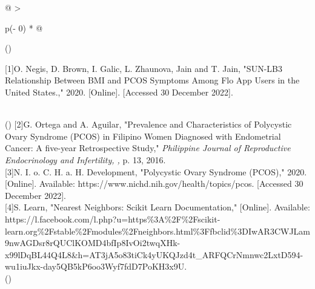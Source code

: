 \documentclass[
]{article}
\begin{document}
\begin{longtable}[]{@{}
  >{\raggedright\arraybackslash}p{(\columnwidth - 0\tabcolsep) * }@{}}
\toprule()
\begin{minipage}[b]{\linewidth}\raggedright
{[}1{]}O. Negis, D. Brown, I. Galic, L. Zhaunova, Jain and T. Jain,
"SUN-LB3 Relationship Between BMI and PCOS Symptoms Among Flo App Users
in the United States.," 2020. {[}Online{]}. {[}Accessed 30 December
2022{]}.
\end{minipage} \\
\midrule()
\endhead
{[}2{]}G. Ortega and A. Aguilar, "Prevalence and Characteristics of
Polycystic Ovary Syndrome (PCOS) in Filipino Women Diagnosed with
Endometrial Cancer: A five-year Retrospective Study," \emph{Philippine
Journal of Reproductive Endocrinology and Infertility, ,} p. 13,
2016. \\
{[}3{]}N. I. o. C. H. a. H. Development, "Polycystic Ovary Syndrome
(PCOS)," 2020. {[}Online{]}. Available:
https://www.nichd.nih.gov/health/topics/pcos. {[}Accessed 30 December
2022{]}. \\
{[}4{]}S. Learn, "Nearest Neighbors: Scikit Learn Documentation,"
{[}Online{]}. Available:
https://l.facebook.com/l.php?u=https\%3A\%2F\%2Fscikit-learn.org\%2Fstable\%2Fmodules\%2Fneighbors.html\%3Ffbclid\%3DIwAR3CWJLam9nwAGDsr8rQUClKOMD4bfIp8IvOi2twqXHk-x99lDqBL44Q4L8\&h=AT3jA5o83tiCk4yUKQJzd4t\_ARFQCrNmnwc2LxtD594-wu1iuJkx-day5QB5kP6oo3Wyf7fdD7PoKH3x9U. \\
\bottomrule()
\end{longtable}
\end{document}
